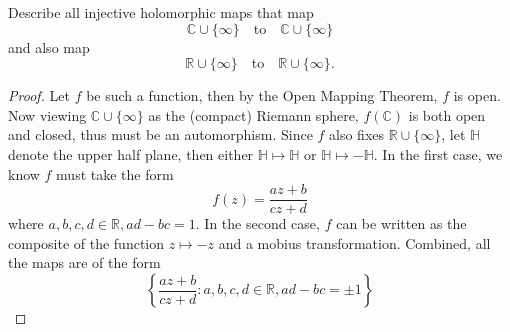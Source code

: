\documentclass[openany]{book}
\newcommand{\R}{\mathbb{R}}
\newcommand{\C}{\mathbb{C}}
\begin{document}
\begin{prob}
Describe all injective holomorphic maps that map
\[
\mathbb{C}\cup\{\infty\}
\quad\text{to}\quad
\mathbb{C}\cup\{\infty\}
\]
and also map
\[
\mathbb{R}\cup\{\infty\}
\quad\text{to}\quad
\mathbb{R}\cup\{\infty\}.
\]
\end{prob}
\begin{proof}
    Let $f$ be such a function, then by the Open Mapping Theorem, $f$ is open. Now viewing $\C\cup\{\infty\}$ as the (compact) Riemann sphere, $f(\C)$ is both open and closed, thus must be an automorphism. Since $f$ also fixes $\R\cup\{\infty\}$, let $\mathbb{H}$ denote the upper half plane, then either $\mathbb{H}\mapsto\mathbb{H}$ or $\mathbb{H}\mapsto -\mathbb{H}$. In the first case, we know $f$ must take the form 
    \begin{equation*}
        f(z)=\frac{az+b}{cz+d}
    \end{equation*}
    where $a,b,c,d\in\R, ad-bc=1$. In the second case, $f$ can be written as the composite of the function $z\mapsto -z$ and a mobius transformation. Combined, all the maps are of the form 
    \begin{equation*}
        \left\{\frac{az+b}{cz+d}: a,b,c,d\in\R, ad-bc=\pm 1\right\}
    \end{equation*}
\end{proof}
\end{document}
